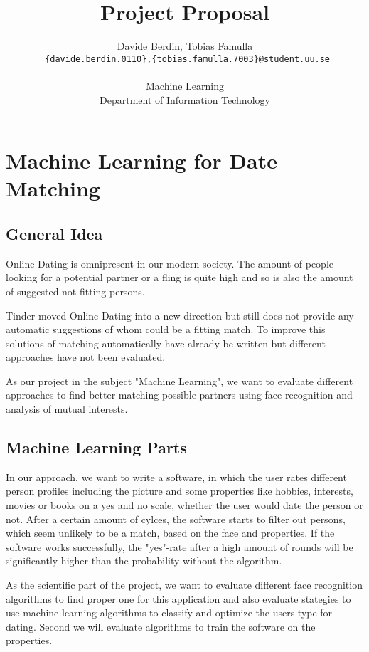\documentclass{article}
\title{Project Proposal}
\author{Davide Berdin, Tobias Famulla
\\ \texttt{ \{davide.berdin.0110\},\{tobias.famulla.7003\}@student.uu.se} \\
\\ Machine Learning 
\\ Department of Information Technology}
\begin{document}
\maketitle
\newpage

\section{Machine Learning for Date Matching}


\subsection{General Idea}

Online Dating is omnipresent in our modern society.
The amount of people looking for a potential partner or a fling is quite high and so is also the amount of suggested not fitting persons.

Tinder moved Online Dating into a new direction but still does not provide any automatic suggestions of whom could be a fitting match.
To improve this solutions of matching automatically have already be written but different approaches have not been evaluated.

As our project in the subject "Machine Learning", we want to evaluate different approaches to find better matching possible partners using face recognition and analysis of mutual interests.

\subsection{Machine Learning Parts}

In our approach, we want to write a software, in which the user rates different person profiles including the picture and some properties like hobbies, interests, movies or books on a yes and no scale, whether the user would date the person or not.
After a certain amount of cylces, the software starts to filter out persons, which seem unlikely to be a match, based on the face and properties.
If the software works successfully, the "yes"-rate after a high amount of rounds will be significantly higher than the probability without the algorithm.

As the scientific part of the project, we want to evaluate different face recognition algorithms to find proper one for this application and also evaluate stategies to use machine learning algorithms to classify and optimize the users type for dating.
Second we will evaluate algorithms to train the software on the properties.
\end{document}

